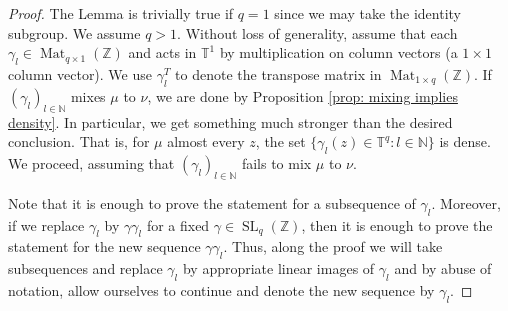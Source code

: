 \documentclass[reqno,11pt, twoside]{amsart}
\theoremstyle{plain}
\theoremstyle{definition}
\theoremstyle{definition}
\theoremstyle{remark}
\numberwithin{equation}{section}
\newcommand{\SL}{\operatorname{SL}}
\newcommand{\T}{{\mathbb{T}}}
\newcommand{\Z}{{\mathbb{Z}}}
\newcommand{\N}{{\mathbb{N}}}
\newcommand{\ga}{\gamma}
\newcommand{\bZ}{\mathbb{Z}}
\newcommand\on[1]{\operatorname{#1}}
\begin{document}
\begin{proof}
    The Lemma is trivially true if $q=1$ since we may take the identity subgroup. We assume $q>1$.
    Without loss of generality, assume that each $\gamma_l \in \on{Mat}_{q\times 1}(\Z)$ and acts in $\T^1$ by multiplication on column vectors (a $1\times 1$ column vector). We use $\gamma_l^T$ to denote the transpose matrix in $\on{Mat}_{1 \times q}(\Z)$.
    If $(\gamma_l)_{l \in \N}$ mixes $\mu$ to $\nu$, we are done by Proposition \ref{prop: mixing implies density}. In particular, we get something much stronger than the desired conclusion. That is, for $\mu$ almost every $z$, the set $\{\gamma_l(z) \in \T^q: l \in \N\}$ is dense.
    We proceed, assuming that $(\gamma_l)_{l \in \N}$ fails to mix $\mu$ to $\nu$. 

    Note that it is enough to prove the statement for a subsequence of $\ga_l$. Moreover, if we replace $\ga_l$ by $\ga \ga_l$ for a fixed $\ga\in \SL_q(\bZ)$, then it is enough to prove the statement for the new sequence 
$\ga\ga_l$. Thus, along the proof we will take subsequences and replace $\ga_l$ by appropriate linear images of $\ga_l$ and by abuse of notation, allow ourselves to continue and denote the new sequence by $\ga_l$.
    

\end{proof}
\end{document}
